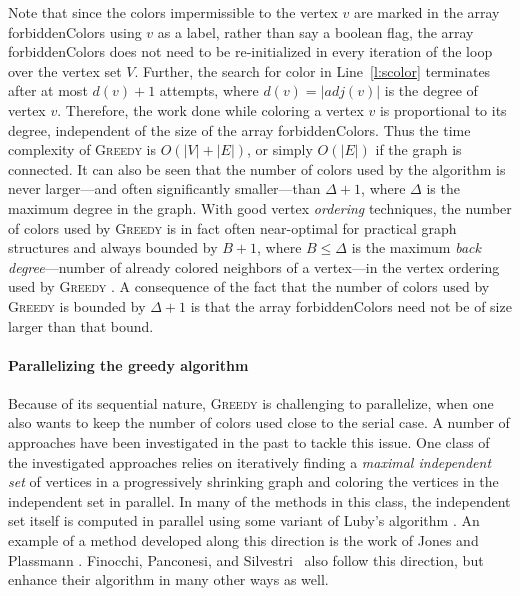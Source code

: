 \documentclass{article}
\begin{document}
Note that since the colors impermissible to the vertex $v$ are marked in the array 
\textsf{forbiddenColors} using $v$ as a label, rather than say a boolean flag,  
the array \textsf{forbiddenColors} does not need to be re-initialized in every iteration of 
the loop over the vertex set $V$. Further, the search for color in Line~\ref{l:scolor} terminates
after at most $d(v) + 1$ attempts, where $d(v) = |\mathit{adj}(v)|$ is the degree of vertex $v$.
Therefore, the work done while coloring a vertex $v$ is proportional to 
its degree, independent of the size of the array \textsf{forbiddenColors}.
Thus the time complexity of \textsc{Greedy} is $O(|V| + |E|)$, 
or simply $O(|E|)$ if the graph is connected.
It can also be seen that the number of colors used by the algorithm 
is never larger---and often significantly smaller---than  $\Delta + 1$, 
where $\Delta$ is the maximum degree in the graph.
With good vertex {\em ordering} techniques, the 
number of colors used by \textsc{Greedy} is in fact often near-optimal for
practical graph structures and always bounded by $B + 1$, where $B \leq \Delta$ is
the maximum {\em back degree}---number of already colored neighbors of a vertex---in 
the vertex ordering used by \textsc{Greedy} \cite{colpack-acm}.
A consequence of the fact that the number of colors used by \textsc{Greedy} is 
bounded by $\Delta + 1$ is that the array \textsf{forbiddenColors} need not be of 
size larger than that bound.

\paragraph{Parallelizing the greedy algorithm}

Because of its sequential nature, \textsc{Greedy} is 
challenging to parallelize, when one also wants to keep the number of colors used close
to the serial case. A number of approaches have been 
investigated  in the past to tackle this issue.  One class of the investigated approaches 
relies on iteratively finding a {\em maximal independent set} of vertices in a progressively
shrinking graph and coloring the vertices in the independent set in parallel. 
In many of the methods in this class, the independent set
itself is computed in parallel using some variant of Luby's algorithm \cite{Luby86}.
An example of a method developed along this direction is the work of
Jones and Plassmann \cite{JP93-v2}. Finocchi, Panconesi, and Silvestri~\cite{FPS02}
also follow this direction, but enhance their algorithm in many other ways as well.
\end{document}
